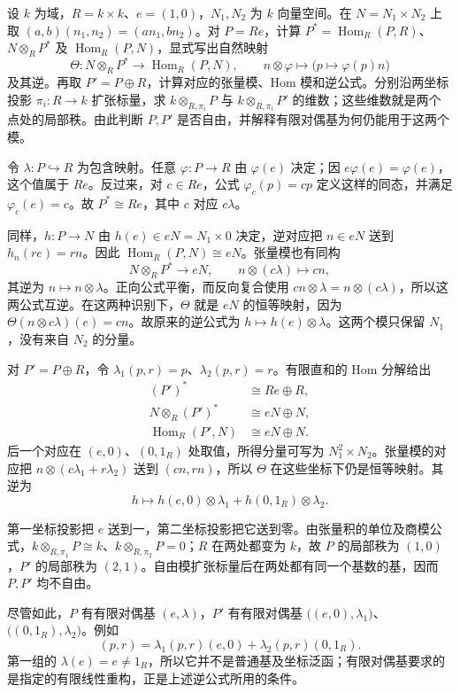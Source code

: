 \begin{exercise}\label{b2:ex:07-projective-hom-tensor}
	设 \(k\) 为域，\(R=k\times k\)、\(e=(1,0)\)，\(N_1,N_2\) 为 \(k\) 向量空间。在 \(N=N_1\times N_2\) 上取 \((a,b)(n_1,n_2)=(an_1,bn_2)\)。对 \(P=Re\)，计算 \(P^*=\operatorname{Hom}_R(P,R)\)、\(N\otimes_RP^*\) 及 \(\operatorname{Hom}_R(P,N)\)，显式写出自然映射
	\[
		\Theta:N\otimes_R P^*\longrightarrow\operatorname{Hom}_R(P,N),\qquad n\otimes\varphi\longmapsto\bigl(p\mapsto\varphi(p)n\bigr)
	\]
	及其逆。再取 \(P'=P\oplus R\)，计算对应的张量模、Hom 模和逆公式。分别沿两坐标投影 \(\pi_i:R\to k\) 扩张标量，求 \(k\otimes_{R,\pi_i}P\) 与 \(k\otimes_{R,\pi_i}P'\) 的维数；这些维数就是两个点处的局部秩。由此判断 \(P,P'\) 是否自由，并解释有限对偶基为何仍能用于这两个模。
\end{exercise}
\begin{solution}
	令 \(\lambda:P\hookrightarrow R\) 为包含映射。任意 \(\varphi:P\to R\) 由 \(\varphi(e)\) 决定；因 \(e\varphi(e)=\varphi(e)\)，这个值属于 \(Re\)。反过来，对 \(c\in Re\)，公式 \(\varphi_c(p)=cp\) 定义这样的同态，并满足 \(\varphi_c(e)=c\)。故 \(P^*\cong Re\)，其中 \(c\) 对应 \(c\lambda\)。

	同样，\(h:P\to N\) 由 \(h(e)\in eN=N_1\times0\) 决定，逆对应把 \(n\in eN\) 送到 \(h_n(re)=rn\)。因此 \(\operatorname{Hom}_R(P,N)\cong eN\)。张量模也有同构
	\[
		N\otimes_RP^*\longrightarrow eN, \qquad n\otimes(c\lambda)\longmapsto cn,
	\]
	其逆为 \(n\mapsto n\otimes\lambda\)。正向公式平衡，而反向复合使用 \(cn\otimes\lambda=n\otimes(c\lambda)\)，所以这两公式互逆。在这两种识别下，\(\Theta\) 就是 \(eN\) 的恒等映射，因为 \(\Theta(n\otimes c\lambda)(e)=cn\)。故原来的逆公式为 \(h\mapsto h(e)\otimes\lambda\)。这两个模只保留 \(N_1\)，没有来自 \(N_2\) 的分量。

	对 \(P'=P\oplus R\)，令 \(\lambda_1(p,r)=p\)、\(\lambda_2(p,r)=r\)。有限直和的 Hom 分解给出
	\[
		\begin{aligned}
			(P')^*&\cong Re\oplus R,\\
			N\otimes_R(P')^*&\cong eN\oplus N,\\
			\operatorname{Hom}_R(P',N)&\cong eN\oplus N.
		\end{aligned}
	\]
	后一个对应在 \((e,0)\)、\((0,1_R)\) 处取值，所得分量可写为 \(N_1^2\times N_2\)。张量模的对应把 \(n\otimes(c\lambda_1+r\lambda_2)\) 送到 \((cn,rn)\)，所以 \(\Theta\) 在这些坐标下仍是恒等映射。其逆为
	\[
		h\longmapsto h(e,0)\otimes\lambda_1+h(0,1_R)\otimes\lambda_2.
	\]

	第一坐标投影把 \(e\) 送到一，第二坐标投影把它送到零。由张量积的单位及商模公式，\(k\otimes_{R,\pi_1}P\cong k\)、\(k\otimes_{R,\pi_2}P=0\)；\(R\) 在两处都变为 \(k\)，故 \(P\) 的局部秩为 \((1,0)\)，\(P'\) 的局部秩为 \((2,1)\)。自由模扩张标量后在两处都有同一个基数的基，因而 \(P,P'\) 均不自由。

	尽管如此，\(P\) 有有限对偶基 \((e,\lambda)\)，\(P'\) 有有限对偶基 \(\bigl((e,0),\lambda_1\bigr)\)、\(\bigl((0,1_R),\lambda_2\bigr)\)。例如
	\[
		(p,r)=\lambda_1(p,r)(e,0)+\lambda_2(p,r)(0,1_R).
	\]
	第一组的 \(\lambda(e)=e\ne1_R\)，所以它并不是普通基及坐标泛函；有限对偶基要求的是指定的有限线性重构，正是上述逆公式所用的条件。
\end{solution}

